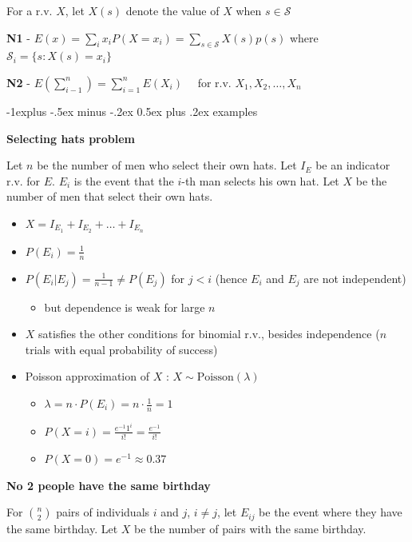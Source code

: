 \documentclass[10pt, landscape]{article}
\makeatletter
\renewcommand{\subsection}{\@startsection{subsection}{2}{0mm}%
  {-1explus -.5ex minus -.2ex}%
  {0.5ex plus .2ex}%
{\normalfont\normalsize\bfseries}}
\makeatother
\begin{document}
\begin{multicols*}{3}
  For a r.v. $X$, let $X(s)$ denote the value of $X$ when $s \in \mathcal{S}$

  \textbf{N1} - $E(x) = \sum\limits_i x_i P(X=x_i) = \sum\limits_{s \in \mathcal{S}} X(s) p(s)$
  where $\mathcal{S}_i = \{s : X(s)=x_i\}$

  \textbf{N2} - $E (\sum\limits_{i-1}^n) = \sum\limits^n_{i=1}E(X_i) \quad$ for r.v. $X_1, X_2, \dots, X_n$

  \subsection{examples}

  \textbf{Selecting hats problem}

  Let $n$ be the number of men who select their own hats.
  Let $I_E$ be an indicator r.v. for $E$. 
  $E_i$ is the event that the $i$-th man selects his own hat.
  Let $X$ be the number of men that select their own hats.

  \begin{itemize}
    \item $X = I_{E_1} + I_{E_2} + \dots + I_{E_n}$
    \item $P(E_i) = \frac{1}{n}$
    \item $P(E_i \vert E_j) = \frac{1}{n-1} \neq P(E_j) $ for $j < i$ (hence $E_i$ and $E_j$ are not independent)
      \begin{itemize}
        \item but dependence is weak for large $n$
      \end{itemize}
    \item $X$ satisfies the other conditions for binomial r.v., besides independence ($n$ trials with equal probability of success)
    \item Poisson approximation of $X$ : $X \sim \text{Poisson}(\lambda)$
      \begin{itemize}
        \item $\lambda = n \cdot P(E_i) = n\cdot \frac{1}{n} = 1$
        \item $P(X=i) = \frac{e^{-1}1^i}{i!} = \frac{e^{-1}}{i!} $ 
        \item $P(X=0) = e^{-1} \approx 0.37$
      \end{itemize}
  \end{itemize}

  \textbf{No 2 people have the same birthday}

  For $\binom{n}{2}$ pairs of individuals $i$ and $j$, $i \neq j$, let $E_{ij}$ be the event where they have the same birthday. 
  Let $X$ be the number of pairs with the same birthday.


\end{multicols*}
\end{document}

